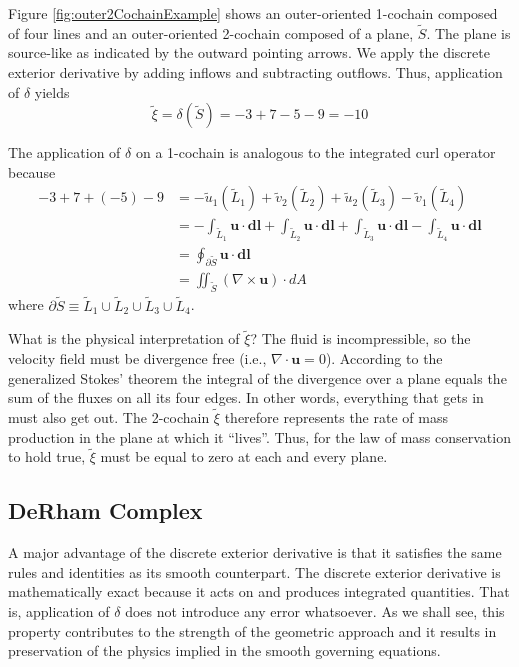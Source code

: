 Figure \ref{fig:outer2CochainExample} shows an outer-oriented 1-cochain composed of four lines and an outer-oriented 2-cochain composed of a plane, $\tilde{S}$. The plane is source-like as indicated by the outward pointing arrows. We apply the discrete exterior derivative by adding inflows and subtracting outflows. Thus, application of $\delta$ yields
\begin{equation}
    \tilde{\xi} = \delta(\tilde{S}) = -3 + 7 - 5 - 9 = -10
\end{equation}

The application of $\delta$ on a 1-cochain is analogous to the integrated curl operator because
\begin{equation}
    \begin{split}
        -3 + 7 + (-5) - 9 &= -\tilde{u}_1(\tilde{L}_1) + \tilde{v}_2(\tilde{L}_2) + \tilde{u}_2(\tilde{L}_3) - \tilde{v}_1(\tilde{L}_4) \\
        &= -\int_{\tilde{L}_1} \mathbf{u} \cdot \mathbf{dl} + \int_{\tilde{L}_2} \mathbf{u} \cdot \mathbf{dl} + \int_{\tilde{L}_3} \mathbf{u} \cdot \mathbf{dl} - \int_{\tilde{L}_4} \mathbf{u} \cdot \mathbf{dl} \\
        &= \oint_{\partial \tilde{S}} \mathbf{u} \cdot \mathbf{dl} \\
        &= \iint_{\tilde{S}} \left( \nabla \times \mathbf{u} \right) \cdot dA
    \end{split}
    \label{eq:curlExample}
\end{equation}
where $\partial \tilde{S} \equiv \tilde{L}_1 \cup \tilde{L}_2 \cup \tilde{L}_3 \cup \tilde{L}_4$. 

What is the physical interpretation of $\tilde{\xi}$? The fluid is incompressible, so the velocity field must be divergence free (i.e., $\nabla \cdot \mathbf{u} = 0$). According to the generalized Stokes' theorem the integral of the divergence over a plane equals the sum of the fluxes on all its four edges. In other words, everything that gets in must also get out. The 2-cochain $\tilde{\xi}$ therefore represents the rate of mass production in the plane at which it ``lives''. Thus, for the law of mass conservation to hold true, $\tilde{\xi}$ must be equal to zero at each and every plane.

\subsection{DeRham Complex}

A major advantage of the discrete exterior derivative is that it satisfies the same rules and identities as its smooth counterpart. The discrete exterior derivative is mathematically exact because it acts on and produces integrated quantities. That is, application of $\delta$ does not introduce any error whatsoever. As we shall see, this property contributes to the strength of the geometric approach and it results in preservation of the physics implied in the smooth governing equations.

